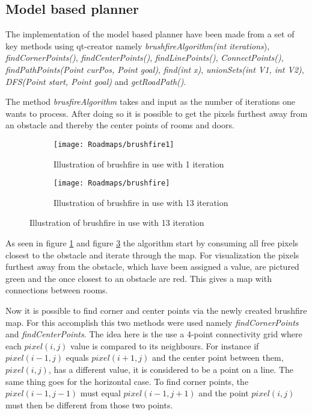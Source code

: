 \documentclass[../Head/Main.tex]{subfiles}
\begin{document}
\subsection{Model based planner}

The implementation of the model based planner have been made from a set of key methods using qt-creator namely \textit{brushfireAlgorithm(int iterations}), \textit{findCornerPoints()}, \textit{findCenterPoints()}, \textit{findLinePoints()}, \textit{ConnectPoints()}, \textit{findPathPoints(Point curPos, Point goal)},\textit{ find(int x)}, \textit{unionSets(int V1, int V2)}, \textit{DFS(Point start, Point goal)} and \textit{getRoadPath()}.

The method \textit{brusfireAlgorithm} takes and input as the number of iterations one wants to process. After doing so it is possible to get the pixels furthest away from an obstacle and thereby the center points of rooms and doors.   

\begin{figure}[H]
  \begin{subfigure}[b]{0.49\textwidth}
    \centering
    \texttt{[image: Roadmaps/brushfire1]}
    \caption{Illustration of brushfire in use with 1 iteration}
    \label{fig:Brushfire1}
  \end{subfigure}
  \hfill
   \begin{subfigure}[b]{0.49\textwidth}
    \centering
    \texttt{[image: Roadmaps/brushfire]}
    \caption{Illustration of brushfire in use with 13 iteration}
    \label{fig:Brusfire2}
  \end{subfigure}
  \end{figure}
  
As seen in figure \ref{fig:Brushfire1} and figure \ref{fig:Brusfire2} the algorithm start by consuming all free pixels closest to the obstacle and iterate through the map. For visualization the pixels furthest away from the obstacle, which have been assigned a value, are pictured green and the once closest to an obstacle are red. This gives a map with connections between rooms. 
  
Now it is possible to find corner and center points via the newly created brushfire map. For this accomplish this two methods were used namely \textit{findCornerPoints} and \textit{findCenterPoints}. The idea here is the use a 4-point connectivity grid where each $pixel(i,j)$ value is compared to its neighbours. For instance if $pixel(i-1,j)$ equals $pixel(i+1,j)$ and the center point between them, $pixel(i,j)$, has a different value, it is considered to be a point on a line. The same thing goes for the horizontal case. To find corner points, the $pixel(i-1,j-1)$ must equal $pixel(i-1,j+1)$ and the point $pixel(i,j)$ must then be different from those two points. \par
      
\end{document}
